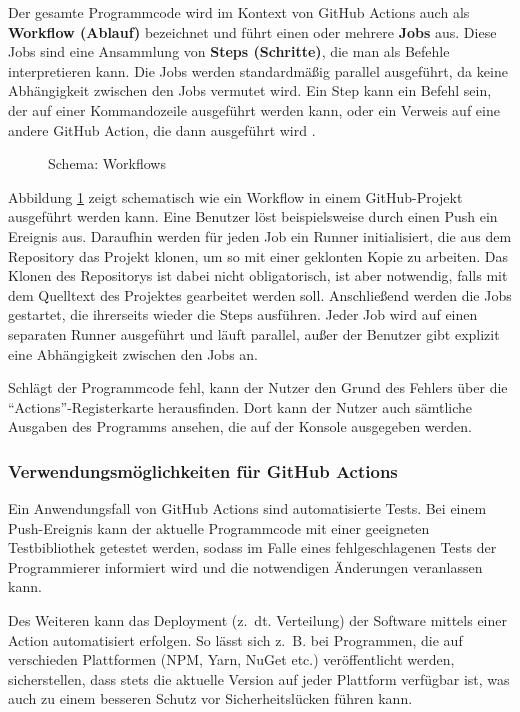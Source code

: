 Der gesamte Programmcode wird im Kontext von GitHub Actions auch als \textbf{Workflow (Ablauf)} bezeichnet und führt einen oder mehrere \textbf{Jobs} aus. Diese Jobs sind eine Ansammlung von \textbf{Steps (Schritte)}, die man als Befehle interpretieren kann. Die Jobs werden standardmäßig parallel ausgeführt, da keine Abhängigkeit zwischen den Jobs vermutet wird. Ein Step kann ein Befehl sein, der auf einer Kommandozeile ausgeführt werden kann, oder ein Verweis auf eine andere GitHub Action, die dann ausgeführt wird \cite[S. 5-7]{github_action_book}. 

\begin{figure}[ht!]
\fontsize{7}{10}\selectfont
    \centering

    \caption{Schema: Workflows}
    \label{fig:workflow_schema}
\end{figure}

Abbildung \ref{fig:workflow_schema} zeigt schematisch wie ein Workflow in einem GitHub-Projekt ausgeführt werden kann. Eine Benutzer löst beispielsweise durch einen Push ein Ereignis aus. Daraufhin werden für jeden Job ein Runner initialisiert, die aus dem Repository das Projekt klonen, um so mit einer geklonten Kopie zu arbeiten.  Das Klonen des Repositorys ist dabei nicht obligatorisch, ist aber notwendig, falls mit dem Quelltext des Projektes gearbeitet werden soll.  Anschließend werden die Jobs gestartet, die ihrerseits wieder die Steps ausführen. Jeder Job wird auf einen separaten Runner ausgeführt und läuft parallel, außer der Benutzer gibt explizit eine Abhängigkeit zwischen den Jobs an. 


Schlägt der Programmcode fehl, kann der Nutzer den Grund des Fehlers über die  \enquote{Actions}-Registerkarte herausfinden. Dort kann der Nutzer auch sämtliche Ausgaben des Programms ansehen, die auf der Konsole ausgegeben werden.

\subsubsection{Verwendungsmöglichkeiten für GitHub Actions}

Ein Anwendungsfall von GitHub Actions sind automatisierte Tests. Bei einem Push-Ereignis kann der aktuelle Programmcode mit einer geeigneten Testbibliothek getestet werden, sodass im Falle eines fehlgeschlagenen Tests der Programmierer informiert wird und die notwendigen Änderungen veranlassen kann.

Des Weiteren kann das Deployment (z.~dt. Verteilung) der Software mittels einer Action automatisiert erfolgen. So lässt sich z.~B. bei Programmen, die auf verschieden Plattformen (NPM, Yarn, NuGet etc.)  veröffentlicht werden, sicherstellen, dass stets die aktuelle Version auf jeder Plattform verfügbar ist, was auch zu einem besseren Schutz vor Sicherheitslücken führen kann. 

